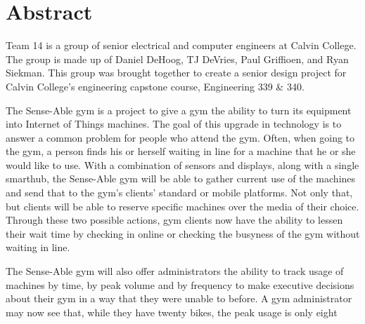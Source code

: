 \documentclass[PPFS.tex]{template/subfiles}
\begin{document}
\section*{Abstract}

Team 14 is a group of senior electrical and computer engineers at Calvin College. The group is made up of Daniel DeHoog, TJ DeVries, Paul Griffioen, and Ryan Siekman. This group was brought together to create a senior design project for Calvin College's engineering capstone course, Engineering 339 \& 340.

The Sense-Able gym is a project to give a gym the ability to turn its equipment into Internet of Things machines. The goal of this upgrade in technology is to answer a common problem for people who attend the gym. Often,  when going to the gym, a person finds his or herself  waiting in line for a machine that he or she would like to use.  With a combination of sensors and displays, along with a single smarthub, the Sense-Able gym will be able to gather current use of the machines and send that to the gym's clients' standard or mobile platforms. Not only that, but clients will be able to reserve specific machines over the media of their choice. Through these two possible actions, gym clients now have the ability to lessen their wait time by checking in online or checking the busyness of the gym without waiting in line.

The Sense-Able gym will also offer administrators the ability to track usage of machines by time, by peak volume and by frequency to make executive decisions about their gym in a way that they were unable to before. A gym administrator may now see that, while they have twenty bikes, the peak usage is only eight
\end{document}
